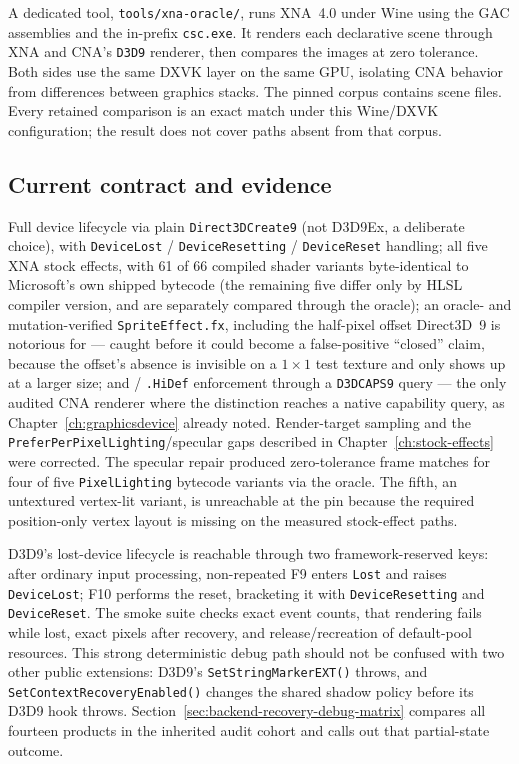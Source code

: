 A dedicated tool, \texttt{tools/xna-oracle/}, runs XNA~4.0 under Wine using the GAC assemblies
and the in-prefix \texttt{csc.exe}. It renders each declarative scene through XNA and CNA's
\texttt{D3D9} renderer, then compares the images at zero tolerance. Both sides use the same DXVK layer on
the same GPU, isolating CNA behavior from differences between graphics stacks. The pinned corpus contains
\XnaOracleSceneCount{} scene files. Every retained comparison is an exact match under this
Wine/DXVK configuration; the result does not cover paths absent from that corpus.

\subsection{Current contract and evidence}

Full device lifecycle via plain \texttt{Direct3DCreate9} (not D3D9Ex, a deliberate choice),
with \texttt{DeviceLost} / \texttt{DeviceResetting} / \texttt{DeviceReset} handling; all
five XNA stock effects, with 61 of 66 compiled shader variants byte-identical to Microsoft's
own shipped bytecode (the remaining five differ only by HLSL compiler version, and are
separately compared through the oracle); an
oracle- and mutation-verified \texttt{SpriteEffect.fx}, including the half-pixel offset
Direct3D~9 is notorious for --- caught before it could become a false-positive ``closed''
claim, because the offset's absence is invisible on a $1\times1$ test texture and only shows
up at a larger size; and  / \texttt{.HiDef} enforcement
through a \texttt{D3DCAPS9} query --- the only audited CNA renderer
where the distinction reaches a native capability query,
as Chapter~\ref{ch:graphicsdevice} already noted. Render-target sampling and the
\texttt{PreferPerPixelLighting}/specular gaps described in Chapter~\ref{ch:stock-effects}
were corrected. The specular repair produced zero-tolerance frame matches for four of five
\texttt{PixelLighting} bytecode variants via the
oracle. The fifth, an untextured vertex-lit variant, is unreachable at the pin because the
required position-only vertex layout is missing on the measured stock-effect paths.

\begin{sourcenote}
D3D9's lost-device lifecycle is reachable through two framework-reserved keys:
after ordinary input processing, non-repeated F9 enters \texttt{Lost} and raises
\texttt{DeviceLost}; F10 performs the reset, bracketing it with
\texttt{DeviceResetting} and \texttt{DeviceReset}. The smoke suite checks exact event counts,
that rendering fails while lost, exact pixels after recovery, and release/recreation of
default-pool resources. This strong deterministic debug path should not be confused with two
other public extensions: D3D9's \texttt{SetStringMarkerEXT()} throws, and
\texttt{SetContextRecoveryEnabled()} changes the shared  shadow policy
before its D3D9 hook throws. Section~\ref{sec:backend-recovery-debug-matrix} compares all
fourteen products in the inherited audit cohort and calls out that partial-state outcome.
\end{sourcenote}


